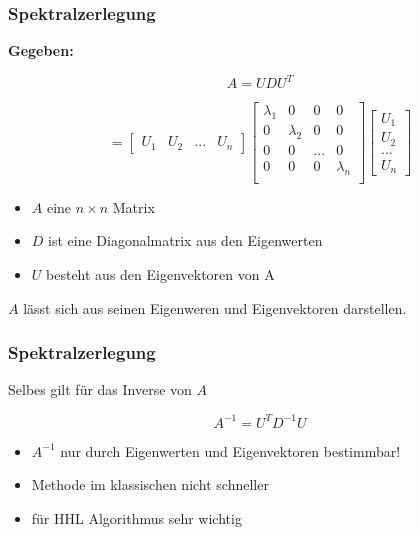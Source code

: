 \begin{frame}
    \frametitle{Spektralzerlegung}

    \textbf{Gegeben: }

    $$A =  U D U^T$$

    $$= \begin{bmatrix} U_1&U_2&...&U_n \end{bmatrix}
    \begin{bmatrix} \lambda_1 & 0 & 0 & 0\\ 0 & \lambda_2 &0 & 0\\ 0 & 0 & ... & 0\\ 0 & 0 & 0& \lambda_n \\ \end{bmatrix}
    \begin{bmatrix} U_1\\ U_2\\ ...\\ U_n\end{bmatrix}$$

    \hfil

    \begin{itemize}
        \item   $A$ eine $n \times n$ Matrix
        \item   $D$ ist eine Diagonalmatrix aus den Eigenwerten
        \item   $U$ besteht aus den Eigenvektoren von A
   \end{itemize}



    \hfil

    $A$ lässt sich aus seinen Eigenweren und Eigenvektoren darstellen.

\end{frame}

\begin{frame}
    \frametitle{Spektralzerlegung}
    Selbes gilt für das Inverse von $A$ 

    $$A^{-1}=  U^T D^{-1} U$$

    \hfil

    \begin{itemize}
        \item  $A^{-1}$ nur durch Eigenwerten und Eigenvektoren bestimmbar!
        \item  Methode im klassischen nicht schneller
        \item  für HHL Algorithmus sehr wichtig
   \end{itemize}
\end{frame}

